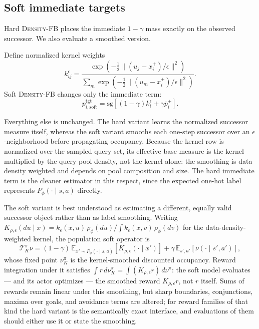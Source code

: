 \documentclass{article}
\newcommand{\E}{\mathbb{E}}
\newcommand{\sg}{\mathrm{sg}}
\newcommand{\DensityFB}{\textsc{Density-FB}}
\begin{document}
\subsection{Soft immediate targets}
\label{sec:soft-targets}

Hard \DensityFB{} places the immediate $1-\gamma$ mass exactly on the observed successor.
We also evaluate a smoothed version.

Define normalized kernel weights
\begin{equation}
k_{ij}^{\epsilon} = \frac{ \exp\!\left( -\frac12 \|(u_j-x_i^+)/\epsilon\|^2 \right)}{ \sum_m \exp\!\left( -\frac12 \|(u_m-x_i^+)/\epsilon\|^2 \right)
}.
\end{equation}
Soft \DensityFB{} changes only the immediate term:
\begin{equation}
\label{eq:soft-target}
    p_{i,\mathrm{soft}}^{\mathrm{tgt}} = \sg\left[ (1-\gamma)k_i^\epsilon + \gamma\bar p_i^+\right].
\end{equation}

Everything else is unchanged.
The hard variant learns the normalized successor measure itself, whereas the soft variant smooths each one-step successor over an $\epsilon$-neighborhood before propagating occupancy.
Because the kernel row is normalized over the sampled query set, its effective base measure is the kernel multiplied by the query-pool density, not the kernel alone: the smoothing is data-density weighted and depends on pool composition and size.
The hard immediate term is the cleaner estimator in this respect, since the expected one-hot label represents $P_\phi(\cdot\mid s,a)$ directly.

The soft variant is best understood as estimating a different, equally valid successor object rather than as label smoothing.
Writing $K_{\rho,\epsilon}(du\mid x) = k_\epsilon(x,u)\,\rho_\phi(du) / \int k_\epsilon(x,v)\,\rho_\phi(dv)$ for the data-density-weighted kernel, the population soft operator is
\begin{equation}
\mathcal T_K^{\pi}\nu = (1-\gamma)\,\E_{x'\sim P_\phi(\cdot\mid s,a)}\!\left[ K_{\rho,\epsilon}(\cdot\mid x') \right] + \gamma\,\E_{s',a'}\!\left[ \nu(\cdot\mid s',a') \right],
\end{equation}
whose fixed point $\nu_K^\pi$ is the kernel-smoothed discounted occupancy.
Reward integration under it satisfies $\int r\,d\nu_K^\pi = \int (K_{\rho,\epsilon}r)\,d\nu^\pi$: the soft model evaluates --- and its actor optimizes --- the smoothed reward $K_{\rho,\epsilon}r$, not $r$ itself.
Sums of rewards remain linear under this smoothing, but sharp boundaries, conjunctions, maxima over goals, and avoidance terms are altered; for reward families of that kind the hard variant is the semantically exact interface, and evaluations of them should either use it or state the smoothing.
\end{document}
